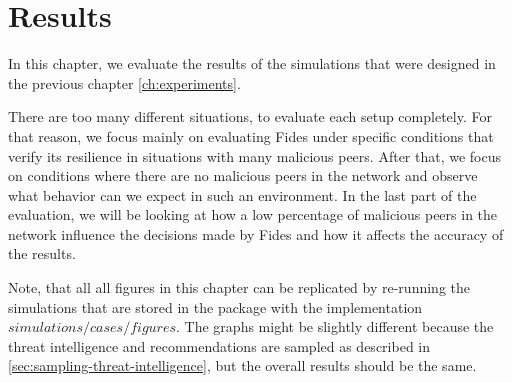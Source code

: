 \chapter{Results}
\label{ch:results}

In this chapter, we evaluate the results of the simulations that were designed in the previous chapter \ref{ch:experiments}.

There are too many different situations, to evaluate each setup completely.
For that reason, we focus mainly on evaluating Fides under specific conditions that verify its resilience in situations with many malicious peers.
After that, we focus on conditions where there are no malicious peers in the network and observe what behavior can we expect in such an environment.
In the last part of the evaluation, we will be looking at how a low percentage of malicious peers in the network influence the decisions made by Fides and how it affects the accuracy of the results.

Note, that all all figures in this chapter can be replicated by re-running the simulations that are stored in the package with the implementation $simulations/cases/figures$.
The graphs might be slightly different because the threat intelligence and recommendations are sampled as described in \ref{sec:sampling-threat-intelligence}, but the overall results should be the same.





